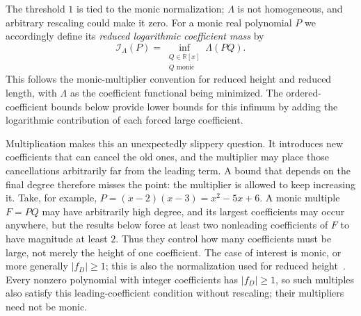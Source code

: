 \documentclass[11pt]{article}
\newcommand{\R}{\mathbb R}
\begin{document}
The threshold $1$ is tied to the monic normalization; $\Lambda$ is not
homogeneous, and arbitrary rescaling could make it zero.  For a monic real
polynomial $P$ we accordingly define its \emph{reduced logarithmic
coefficient mass} by
\[
  \mathcal I_\Lambda(P)=
  \inf_{\substack{Q\in\R[x]\\Q\text{ monic}}}\Lambda(PQ).
\]
This follows the monic-multiplier convention for reduced height and reduced
length, with $\Lambda$ as the coefficient functional being minimized.  The
ordered-coefficient bounds below provide lower bounds for this infimum by
adding the logarithmic contribution of each forced large coefficient.

Multiplication makes this an unexpectedly slippery question.  It introduces
new coefficients that can cancel the old ones, and the multiplier may place
those cancellations arbitrarily far from the leading term.  A bound that
depends on the final degree therefore misses the point: the multiplier is
allowed to keep increasing it.  Take, for example,
$P=(x-2)(x-3)=x^2-5x+6$.  A monic multiple $F=PQ$ may have arbitrarily high
degree, and its largest coefficients may occur anywhere, but the results
below force at least two nonleading coefficients of $F$ to have magnitude
at least $2$.  Thus they control how many coefficients must be large, not
merely the height of one coefficient.  The case of interest is monic, or
more generally $|f_D|\ge1$; this is also the normalization used for reduced
height~\cite{dj}.  Every nonzero polynomial with integer coefficients has
$|f_D|\ge1$, so such multiples also satisfy this leading-coefficient
condition without rescaling; their multipliers need not be monic.
\end{document}
